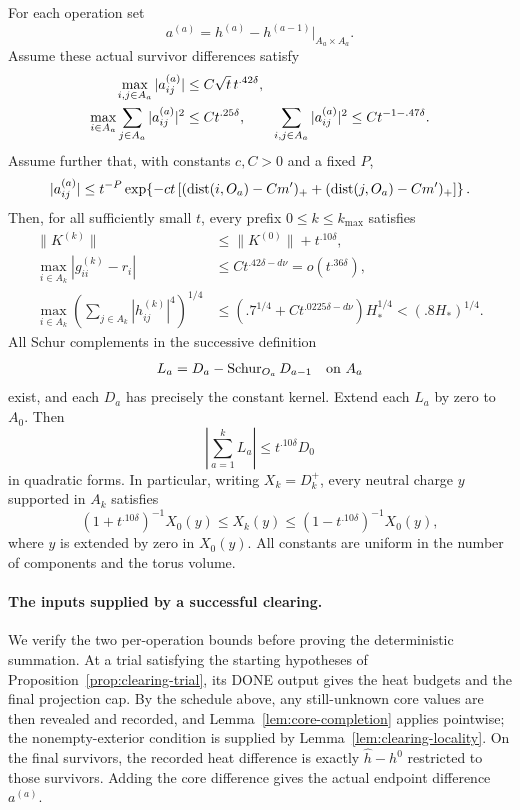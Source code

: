 \begin{proposition}
For each operation set
\[
 a^{(a)}=h^{(a)}-h^{(a-1)}|_{A_a\times A_a}.
\]
Assume these actual survivor differences satisfy
\begin{align}
 \max_{i,j\in A_a}|a^{(a)}_{ij}|
 &\le C\sqrt t\,t^{.42\delta},\notag\\
 \max_{i\in A_a}\sum_{j\in A_a}|a^{(a)}_{ij}|^2
 &\le Ct^{.25\delta},\qquad
 \sum_{i,j\in A_a}|a^{(a)}_{ij}|^2
 \le Ct^{-1-.47\delta}.
 \label{eq:assembly-single-distortions}
\end{align}
Assume further that, with constants $c,C>0$ and a fixed $P$,
\begin{equation}
 |a^{(a)}_{ij}|
 \le t^{-P}\exp\!\left\{-ct\left[
 (\operatorname{dist}(i,O_a)-Cm')_++(\operatorname{dist}(j,O_a)-Cm')_+
 \right]\right\}.
 \label{eq:assembly-single-decay}
\end{equation}
Then, for all sufficiently small $t$, every prefix $0\le k\le k_{\max}$
satisfies
\begin{align}
 \|K^{(k)}\|&\le\|K^{(0)}\|+t^{.10\delta},
 \label{eq:assembly-K-output}\\
 \max_{i\in A_k}|g^{(k)}_{ii}-r_i|
 &\le Ct^{.42\delta-d\nu}=o(t^{.36\delta}),
 \label{eq:assembly-lag-output}\\
 \max_{i\in A_k}\left(\sum_{j\in A_k}|h^{(k)}_{ij}|^4\right)^{1/4}
 &\le\left(.7^{1/4}+Ct^{.0225\delta-d\nu}\right)H_*^{1/4}
 <(.8H_*)^{1/4}.
 \label{eq:assembly-row-output}
\end{align}
All Schur complements in the successive definition
\[
 L_a=D_a-\operatorname{Schur}_{O_a}D_{a-1}\quad\hbox{on }A_a
\]
exist, and each $D_a$ has precisely the constant kernel. Extend each
$L_a$ by zero to $A_0$. Then
\begin{equation}
 \left|\sum_{a=1}^k L_a\right|
 \le t^{.10\delta}D_0
 \label{eq:assembly-energy-output}
\end{equation}
in quadratic forms.  In particular, writing $X_k=D_k^+$, every neutral
charge $y$ supported in $A_k$ satisfies
\begin{equation}
 (1+t^{.10\delta})^{-1}X_0(y)
 \le X_k(y)\le
 (1-t^{.10\delta})^{-1}X_0(y),
 \label{eq:assembly-inverse-output}
\end{equation}
where $y$ is extended by zero in $X_0(y)$.  All constants are uniform
in the number of components and the torus volume.
\end{proposition}

\paragraph{The inputs supplied by a successful clearing.}
We verify the two per-operation bounds before proving the deterministic
summation. At a trial satisfying the starting hypotheses of
Proposition~\ref{prop:clearing-trial}, its DONE output gives the heat
budgets and the final projection cap. By the schedule above, any
still-unknown core values are then revealed and recorded, and
Lemma~\ref{lem:core-completion} applies pointwise; the nonempty-exterior
condition is supplied by Lemma~\ref{lem:clearing-locality}.
On the final survivors, the recorded heat difference is exactly
$\hat h-h^0$ restricted to those survivors. Adding the core difference
gives the actual endpoint difference $a^{(a)}$.

